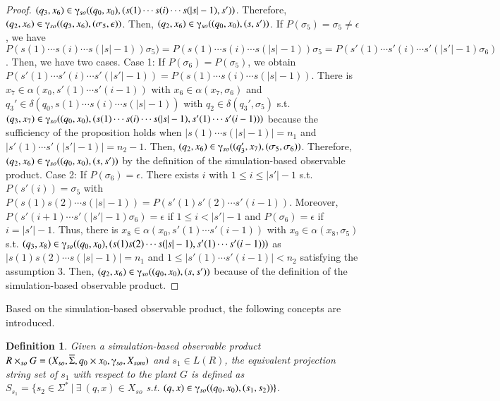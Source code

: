 \documentclass[12pt,draftcls,onecolumn]{IEEEtran}
\newtheorem{Definition}{Definition}
\begin{document}
\begin{proof}
$(q_3, x_6) \in \gammaup_{so}((q_0, x_0), (s(1)\cdots s(i)\cdots
s(|s|-1), s'))$. Therefore, $(q_2, x_6) \in \gammaup_{so}((q_3,
x_6), (\sigma_5, \epsilon))$. Then, $(q_2, x_6) \in
\gammaup_{so}((q_0, x_0), (s, s'))$. If $P(\sigma_5)=\sigma_5 \neq
\epsilon$, we have $P(s(1)\cdots s(i)\cdots
s(|s|-1))\sigma_5)=P(s(1)\cdots s(i)\cdots
s(|s|-1))\sigma_5=P(s'(1)\cdots s'(i)\cdots s'(|s'|-1)\sigma_6)$.
Then, we have two cases. Case 1: If $P(\sigma_6)=P(\sigma_5)$, we
obtain $P(s'(1)\cdots s'(i)\cdots s'(|s'|-1))= P(s(1)\cdots
s(i)\cdots s(|s|-1))$. There is $x_7 \in \alpha(x_0, s'(1)\cdots
s'(i-1))$ with $x_6 \in \alpha(x_7, \sigma_6)$ and $q_3' \in
\delta(q_0, s(1)\cdots s(i)\cdots s(|s|-1))$ with $q_2 \in
\delta(q_3', \sigma_5)$ s.t. $(q_3, x_7) \in \gammaup_{so}((q_0,
x_0), (s(1)\cdots s(i)\cdots s(|s|-1), s'(1)\cdots s'(i-1)))$
because the sufficiency of the proposition holds when $|s(1)\cdots
s(|s|-1)|=n_1$ and $|s'(1)\cdots s'(|s'|-1)|=n_2-1$. Then, $(q_2,
x_6) \in \gammaup_{so}((q_3', x_7), (\sigma_5, \sigma_6))$.
Therefore, $(q_2, x_6) \in \gammaup_{so}((q_0, x_0), (s, s'))$ by
the definition of the simulation-based observable product. Case 2:
If $P(\sigma_6)=\epsilon$. There exists $i$ with $1\leq
i\leq|s'|-1$ s.t. $P(s'(i))=\sigma_5$ with $P(s(1)s(2)\cdots
s(|s|-1))=P(s'(1)s'(2)\cdots s'(i-1))$. Moreover, $P(s'(i+1)\cdots
s'(|s'|-1)\sigma_6)=\epsilon$ if $1 \leq i < |s'|-1$ and
$P(\sigma_6)=\epsilon$ if $i=|s'|-1$. Thus, there is $x_8 \in
\alpha(x_0, s'(1)\cdots s'(i-1))$ with $x_9 \in \alpha(x_8,
\sigma_5)$ s.t. $(q_3, x_8) \in \gammaup_{so}((q_0, x_0),
(s(1)s(2)\cdots s(|s|-1), s'(1)\cdots s'(i-1)))$ as
$|s(1)s(2)\cdots s(|s|-1)|=n_1$ and $1\leq|s'(1)\cdots
s'(i-1)|<n_2$ satisfying the assumption 3. Then, $(q_2, x_6) \in
\gammaup_{so}((q_0, x_0), (s, s'))$ because of the definition of
the simulation-based observable product.
\end{proof}

Based on the simulation-based observable product, the following
concepts are introduced.

\begin{Definition}
Given a simulation-based observable product $R \times_{so} G =
(X_{so}, \overline{\Sigma}, q_0 \times x_0, \gammaup_{so},
X_{som})$ and $s_1 \in L(R)$, the equivalent projection string set
of $s_1$ with respect to the plant $G$ is defined as
$S_{s_1}=\{s_2 \in \Sigma^{*} ~| ~\exists ~(q, x) \in X_{so}$ s.t.
$(q, x)\in \gammaup_{so}((q_0, x_0),(s_1, s_2))\}$.
\end{Definition}
\end{document}
